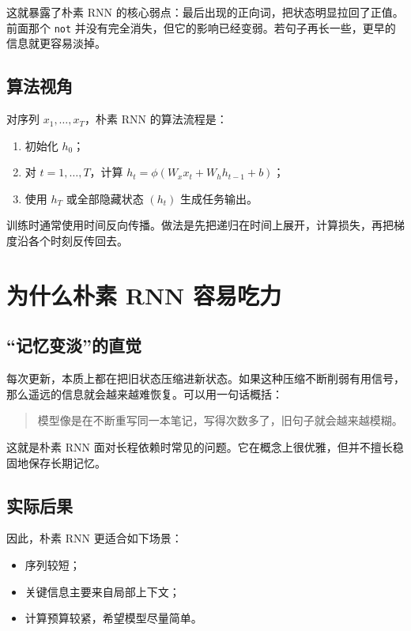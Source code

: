 \documentclass[12pt,a4paper]{ctexart}
\begin{document}
这就暴露了朴素 RNN 的核心弱点：最后出现的正向词，把状态明显拉回了正值。前面那个 \texttt{not} 并没有完全消失，但它的影响已经变弱。若句子再长一些，更早的信息就更容易淡掉。

\subsection{算法视角}

对序列 \(x_1,\dots,x_T\)，朴素 RNN 的算法流程是：

\begin{enumerate}
  \item 初始化 \(h_0\)；
  \item 对 \(t=1,\dots,T\)，计算 \(h_t = \phi(W_x x_t + W_h h_{t-1} + b)\)；
  \item 使用 \(h_T\) 或全部隐藏状态 \((h_t)\) 生成任务输出。
\end{enumerate}

训练时通常使用时间反向传播。做法是先把递归在时间上展开，计算损失，再把梯度沿各个时刻反传回去。

\section{为什么朴素 RNN 容易吃力}

\subsection{“记忆变淡”的直觉}

每次更新，本质上都在把旧状态压缩进新状态。如果这种压缩不断削弱有用信号，那么遥远的信息就会越来越难恢复。可以用一句话概括：
\begin{quote}
模型像是在不断重写同一本笔记，写得次数多了，旧句子就会越来越模糊。
\end{quote}

这就是朴素 RNN 面对长程依赖时常见的问题。它在概念上很优雅，但并不擅长稳固地保存长期记忆。

\subsection{实际后果}

因此，朴素 RNN 更适合如下场景：
\begin{itemize}
  \item 序列较短；
  \item 关键信息主要来自局部上下文；
  \item 计算预算较紧，希望模型尽量简单。
\end{itemize}
\end{document}
